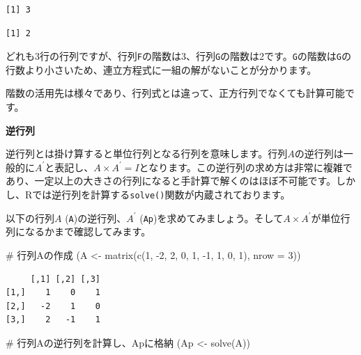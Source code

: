 \documentclass[
  a4paper,
  pandoc,
  ja=standard,
  jafont=haranoaji]{bxjsbook}
\newenvironment{Shaded}{\begin{snugshade}}{\end{snugshade}}
\newcommand{\AttributeTok}[1]{\textcolor[rgb]{0.00,0.48,0.65}{#1}}
\newcommand{\CommentTok}[1]{\textcolor[rgb]{0.37,0.37,0.37}{#1}}
\newcommand{\DecValTok}[1]{\textcolor[rgb]{0.68,0.00,0.00}{#1}}
\newcommand{\FunctionTok}[1]{\textcolor[rgb]{0.28,0.35,0.67}{#1}}
\newcommand{\NormalTok}[1]{\textcolor[rgb]{0.00,0.48,0.65}{#1}}
\newcommand{\OtherTok}[1]{\textcolor[rgb]{0.00,0.48,0.65}{#1}}
\newcommand{\SpecialCharTok}[1]{\textcolor[rgb]{0.37,0.37,0.37}{#1}}
\begin{document}
\begin{verbatim}
[1] 3
\end{verbatim}

\begin{Shaded}
\end{Shaded}

\begin{verbatim}
[1] 2
\end{verbatim}

どれも3行の行列ですが、行列\texttt{F}の階数は3、行列\texttt{G}の階数は2です。\texttt{G}の階数は\texttt{G}の行数より小さいため、連立方程式に一組の解がないことが分かります。

階数の活用先は様々であり、行列式とは違って、正方行列でなくても計算可能です。

\textbf{逆行列}

逆行列とは掛け算すると単位行列となる行列を意味します。行列\(A\)の逆行列は一般的に\(A^{\prime}\)と表記し、\(A \times A^{\prime} = I\)となります。この逆行列の求め方は非常に複雑であり、一定以上の大きさの行列になると手計算で解くのはほぼ不可能です。しかし、Rでは逆行列を計算する\texttt{solve()}関数が内蔵されております。

以下の行列\(A\) (\texttt{A})の逆行列、\(A^{\prime}\)
(\texttt{Ap})を求めてみましょう。そして\(A \times A^{\prime}\)が単位行列になるかまで確認してみます。

\begin{Shaded}
\begin{Highlighting}[numbers=left,,]
\CommentTok{\# 行列Aの作成}
\NormalTok{(A  }\OtherTok{\textless{}{-}} \FunctionTok{matrix}\NormalTok{(}\FunctionTok{c}\NormalTok{(}\DecValTok{1}\NormalTok{, }\SpecialCharTok{{-}}\DecValTok{2}\NormalTok{, }\DecValTok{2}\NormalTok{, }\DecValTok{0}\NormalTok{, }\DecValTok{1}\NormalTok{, }\SpecialCharTok{{-}}\DecValTok{1}\NormalTok{, }\DecValTok{1}\NormalTok{, }\DecValTok{0}\NormalTok{, }\DecValTok{1}\NormalTok{), }\AttributeTok{nrow =} \DecValTok{3}\NormalTok{))}
\end{Highlighting}
\end{Shaded}

\begin{verbatim}
     [,1] [,2] [,3]
[1,]    1    0    1
[2,]   -2    1    0
[3,]    2   -1    1
\end{verbatim}

\begin{Shaded}
\begin{Highlighting}[numbers=left,,]
\CommentTok{\# 行列Aの逆行列を計算し、Apに格納}
\NormalTok{(Ap }\OtherTok{\textless{}{-}} \FunctionTok{solve}\NormalTok{(A))}
\end{Highlighting}
\end{Shaded}
\end{document}
